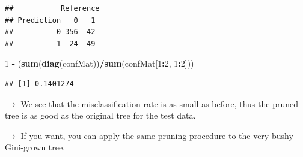 \documentclass[10pt,ignorenonframetext,]{beamer}
\newenvironment{Shaded}{\begin{snugshade}}{\end{snugshade}}
\newcommand{\KeywordTok}[1]{\textcolor[rgb]{0.13,0.29,0.53}{\textbf{#1}}}
\newcommand{\DataTypeTok}[1]{\textcolor[rgb]{0.13,0.29,0.53}{#1}}
\newcommand{\DecValTok}[1]{\textcolor[rgb]{0.00,0.00,0.81}{#1}}
\newcommand{\StringTok}[1]{\textcolor[rgb]{0.31,0.60,0.02}{#1}}
\newcommand{\OperatorTok}[1]{\textcolor[rgb]{0.81,0.36,0.00}{\textbf{#1}}}
\newcommand{\NormalTok}[1]{#1}
\begin{document}
\begin{frame}[fragile]

\scriptsize

\begin{Shaded}
\end{Shaded}

\begin{verbatim}
##           Reference
## Prediction   0   1
##          0 356  42
##          1  24  49
\end{verbatim}

\begin{Shaded}
\begin{Highlighting}[]
\DecValTok{1} \OperatorTok{-}\StringTok{ }\NormalTok{(}\KeywordTok{sum}\NormalTok{(}\KeywordTok{diag}\NormalTok{(confMat))}\OperatorTok{/}\KeywordTok{sum}\NormalTok{(confMat[}\DecValTok{1}\OperatorTok{:}\DecValTok{2}\NormalTok{, }\DecValTok{1}\OperatorTok{:}\DecValTok{2}\NormalTok{]))}
\end{Highlighting}
\end{Shaded}

\begin{verbatim}
## [1] 0.1401274
\end{verbatim}

\normalsize

\(\rightarrow\) We see that the misclassification rate is as small as
before, thus the pruned tree is as good as the original tree for the
test data.

\vspace{2mm}

\(\rightarrow\) If you want, you can apply the same pruning procedure to
the very bushy Gini-grown tree.

\end{frame}
\end{document}
